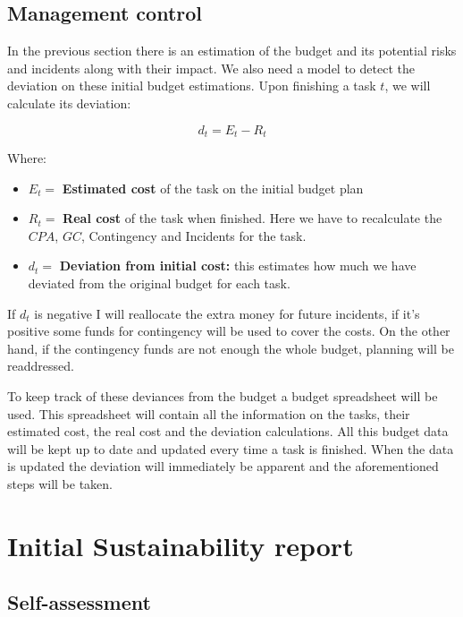 \pagebreak
\subsection{Management control}

In the previous section there is an estimation of the budget and its potential risks and
incidents along with their impact. We also need a model to detect the
deviation on these initial budget estimations. Upon finishing a task $t$, we will
calculate its deviation:

\begin{equation}
    d_t = E_t - R_t
\end{equation}

Where:

\begin{itemize}
    \item $E_t = $ \textbf{Estimated cost} of the task on the initial budget
        plan
    \item $R_t = $ \textbf{Real cost} of the task when finished. Here we have to
        recalculate the $CPA$, $GC$, Contingency and Incidents for the task.
    \item $d_t = $ \textbf{Deviation from initial cost:} this estimates how much
        we have deviated from the original budget for each task.
\end{itemize}

If $d_t$ is negative I will reallocate the extra money for future incidents, if
it's positive some funds for contingency will be used to cover the costs.
On the other hand, if the contingency funds are not enough the whole budget,
planning will be readdressed.

To keep track of these deviances from the budget a budget spreadsheet will be
used. This spreadsheet will contain all the information on the tasks, their
estimated cost, the real cost and the deviation calculations. All this budget
data will be kept up to date and updated every time a task is finished. When the
data is updated the deviation will immediately be apparent and the
aforementioned steps will be taken.

\pagebreak
\section{Initial Sustainability report}%
\label{sec:sustainability-init}

\subsection{Self-assessment}

